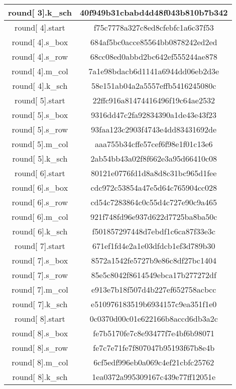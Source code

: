 \begin{center}
\begin{longtable}{|c|c|}
\hline
round[ 3].k\_sch& 40f949b31cbabd4d48f043b810b7b342 \\
\hline
round[ 4].start& f75c7778a327c8ed8cfebfc1a6c37f53 \\
\hline
round[ 4].s\_box& 684af5bc0acce85564bb0878242ed2ed \\
\hline
round[ 4].s\_row& 68cc08ed0abbd2bc642ef555244ae878 \\
\hline
round[ 4].m\_col& 7a1e98bdacb6d1141a6944dd06eb2d3e \\
\hline
round[ 4].k\_sch& 58e151ab04a2a5557effb5416245080c \\
\hline
round[ 5].start& 22ffc916a81474416496f19c64ae2532 \\
\hline
round[ 5].s\_box& 9316dd47c2fa92834390a1de43e43f23 \\
\hline
round[ 5].s\_row& 93faa123c2903f4743e4dd83431692de \\
\hline
round[ 5].m\_col& aaa755b34cffe57cef6f98e1f01c13e6 \\
\hline
round[ 5].k\_sch& 2ab54bb43a02f8f662e3a95d66410c08 \\
\hline
round[ 6].start& 80121e0776fd1d8a8d8c31bc965d1fee \\
\hline
round[ 6].s\_box& cdc972c53854a47e5d64c765904cc028 \\
\hline
round[ 6].s\_row& cd54c7283864c0c55d4c727e90c9a465 \\
\hline
round[ 6].m\_col& 921f748fd96e937d622d7725ba8ba50c \\
\hline
round[ 6].k\_sch& f501857297448d7ebdf1c6ca87f33e3c \\
\hline
round[ 7].start& 671ef1fd4e2a1e03dfdcb1ef3d789b30 \\
\hline
round[ 7].s\_box& 8572a1542fe5727b9e86c8df27bc1404 \\
\hline
round[ 7].s\_row& 85e5c8042f8614549ebca17b277272df \\
\hline
round[ 7].m\_col& e913e7b18f507d4b227ef652758acbcc \\
\hline
round[ 7].k\_sch& e510976183519b6934157c9ea351f1e0 \\
\hline
round[ 8].start& 0c0370d00c01e622166b8accd6db3a2c \\
\hline
round[ 8].s\_box& fe7b5170fe7c8e93477f7e4bf6b98071 \\
\hline
round[ 8].s\_row& fe7c7e71fe7f807047b95193f67b8e4b \\
\hline
round[ 8].m\_col& 6cf5edf996eb0a069c4ef21cbfc25762 \\
\hline
round[ 8].k\_sch& 1ea0372a995309167c439e77ff12051e \\

\end{longtable}
\end{center}
